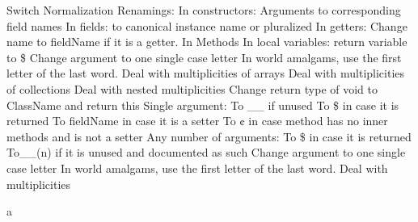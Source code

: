 Switch Normalization
Renamings:
In constructors: Arguments to corresponding field names
In fields: to canonical instance name or pluralized
In getters: Change name to fieldName if it is a getter.
In Methods
In local variables:
return variable to \$
Change argument to one single case letter
In world amalgams, use the first letter of the last word.
Deal with multiplicities of arrays
Deal with multiplicities of collections
Deal with nested multiplicities
Change return type of void to ClassName and return this
Single argument:
To \_\_ if unused
To \$ in case it is returned
To fieldName in case it is a setter
To ¢ in case method has no inner methods and is not a setter
Any number of arguments:
To \$ in case it is returned
To__(n) if it is unused and documented as such
Change argument to one single case letter
In world amalgams, use the first letter of the last word.
Deal with multiplicities

a
